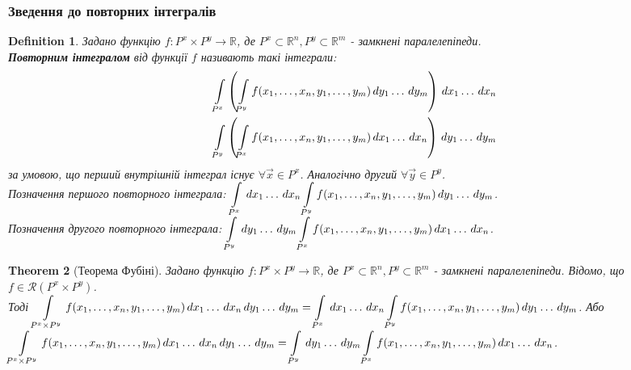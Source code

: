 \documentclass[a4paper, 10pt]{article}
\def\huge{\displaystyle}
\theoremstyle{theoremdd}
\newtheorem{theorem}{Theorem}[subsection]
\theoremstyle{theoremdd}
\newtheorem{definition}[theorem]{Definition}
\theoremstyle{theoremdd}
\theoremstyle{theoremdd}
\theoremstyle{theoremdd}
\theoremstyle{theoremdd}
\theoremstyle{theoremdd}
\theoremstyle{theoremdd}
\begin{document}
\subsubsection{Зведення до повторних інтегралів}
\begin{definition}
Задано функцію $f: P^x \times P^y \to \mathbb{R}$, де $P^x \subset \mathbb{R}^n, P^y \subset \mathbb{R}^m$ - замкнені паралелепіпеди.\\
\textbf{Повторним інтегралом} від функції $f$ називають такі інтеграли:
\begin{align*}
\int\displaylimits_{P^x} \left( \int\displaylimits_{P^y} f(x_1,\dots,x_n,y_1,\dots,y_m)\,dy_1\dots\,dy_m \right)\,dx_1\dots\,dx_n \\
\int\displaylimits_{P^y} \left( \int\displaylimits_{P^x} f(x_1,\dots,x_n,y_1,\dots,y_m)\,dx_1\dots\,dx_n \right)\,dy_1\dots\,dy_m
\end{align*}
за умовою, що перший внутрішній інтеграл існує $\forall \vec{x} \in P^x$. Аналогічно другий $\forall \vec{y} \in P^y$.\\
Позначення першого повторного інтеграла: $\huge\int\displaylimits_{P^x}\,dx_1\dots\,dx_n \int\displaylimits_{P^y} f(x_1,\dots,x_n,y_1,\dots,y_m)\,dy_1\dots\,dy_m$.\\
Позначення другого повторного інтеграла: $\huge\int\displaylimits_{P^y}\,dy_1\dots\,dy_m \int\displaylimits_{P^x} f(x_1,\dots,x_n,y_1,\dots,y_m)\,dx_1\dots\,dx_n$.
\end{definition}

\begin{theorem}[Теорема Фубіні]
Задано функцію $f: P^x \times P^y \to \mathbb{R}$, де $P^x \subset \mathbb{R}^n, P^y \subset \mathbb{R}^m$ - замкнені паралелепіпеди. Відомо, що $f \in \mathcal{R}(P^x \times P^y)$.\\ 
Тоді $\huge\int\displaylimits_{P^x \times P^y} f(x_1,\dots,x_n,y_1,\dots,y_m)\,dx_1\dots\,dx_n\,dy_1\dots\,dy_m = \huge\int\displaylimits_{P^x}\,dx_1\dots\,dx_n \int\displaylimits_{P^y} f(x_1,\dots,x_n,y_1,\dots,y_m)\,dy_1\dots\,dy_m$.
Або $\huge\int\displaylimits_{P^x \times P^y} f(x_1,\dots,x_n,y_1,\dots,y_m)\,dx_1\dots\,dx_n\,dy_1\dots\,dy_m = \huge\int\displaylimits_{P^y}\,dy_1\dots\,dy_m \int\displaylimits_{P^x} f(x_1,\dots,x_n,y_1,\dots,y_m)\,dx_1\dots\,dx_n$.
\end{theorem}
\end{document}
